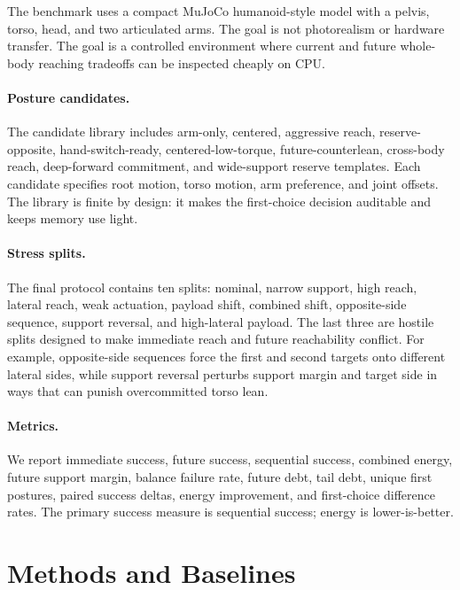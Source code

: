 \documentclass{article}
\begin{document}
The benchmark uses a compact MuJoCo humanoid-style model with a pelvis, torso, head, and two articulated arms. The goal is not photorealism or hardware transfer. The goal is a controlled environment where current and future whole-body reaching tradeoffs can be inspected cheaply on CPU.

\paragraph{Posture candidates.}
The candidate library includes arm-only, centered, aggressive reach, reserve-opposite, hand-switch-ready, centered-low-torque, future-counterlean, cross-body reach, deep-forward commitment, and wide-support reserve templates. Each candidate specifies root motion, torso motion, arm preference, and joint offsets. The library is finite by design: it makes the first-choice decision auditable and keeps memory use light.

\paragraph{Stress splits.}
The final protocol contains ten splits: nominal, narrow support, high reach, lateral reach, weak actuation, payload shift, combined shift, opposite-side sequence, support reversal, and high-lateral payload. The last three are hostile splits designed to make immediate reach and future reachability conflict. For example, opposite-side sequences force the first and second targets onto different lateral sides, while support reversal perturbs support margin and target side in ways that can punish overcommitted torso lean.

\paragraph{Metrics.}
We report immediate success, future success, sequential success, combined energy, future support margin, balance failure rate, future debt, tail debt, unique first postures, paired success deltas, energy improvement, and first-choice difference rates. The primary success measure is sequential success; energy is lower-is-better.

\section{Methods and Baselines}
\end{document}
